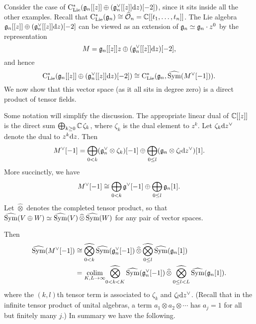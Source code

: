 Consider the case of ${\rm C}_{\rm Lie}^*(\mathfrak{g}_n[[z]] \oplus (\mathfrak{g}_n^\vee[[z]]{\rm d} z)[-2])$,
since it sits inside all the other examples.
Recall that ${\rm C}_{\rm Lie}^*(\mathfrak{g}_n) \cong \widehat{\mathcal O}_n = \mathbb C[[t_1,\ldots,t_n]]$.
The Lie algebra $\mathfrak{g}_n[[z]] \oplus (\mathfrak{g}_n^\vee[[z]]{\rm d} z)[-2]$ can be viewed 
as an extension of $\mathfrak{g}_n \simeq \mathfrak{g}_n \cdot z^0$ by the representation 
\[
M = \mathfrak{g}_n[[z]]z \oplus (\mathfrak{g}_n^\vee[[z]]{\rm d} z)[-2],
\]
and hence
\[
{\rm C}_{\rm Lie}^*(\mathfrak{g}_n[[z]] \oplus (\mathfrak{g}_n^\vee[[z]]{\rm d} z)[-2]) \cong {\rm C}_{\rm Lie}^*(\mathfrak{g}_n, \widehat{{\rm Sym}}(M^\vee[-1])).
\]
We now show that this vector space (as it all sits in degree zero) is a direct product of tensor fields.

Some notation will simplify the discussion. 
The appropriate linear dual of $\mathbb C[[z]]$ is the direct sum $\bigoplus_{k \geq 0 } \mathbb C \, \zeta_k$,
where $\zeta_k$ is the dual element to $z^k$.
Let $\zeta_k {\rm d} z^\vee$ denote the dual to $z^k{\rm d} z$.
Then
\[
M^\vee[-1] = \bigoplus_{0<k} (\mathfrak{g}_n^\vee \otimes \zeta_k)[-1] \oplus \bigoplus_{0\leq l} (\mathfrak{g}_n \otimes \zeta_l {\rm d} z^\vee)[1].
\]
More succinctly, we have
\[
M^\vee[-1] \cong \bigoplus_{0<k} \mathfrak g^\vee[-1] \oplus \bigoplus_{0\leq l} \mathfrak{g}_n[1].
\]
Let $\widehat{\otimes}$ denotes the completed tensor product, 
so that $\widehat{{\rm Sym}}(V \oplus W) \simeq \widehat{{\rm Sym}}(V)
\,\widehat{\otimes}\,\widehat{{\rm Sym}}(W)$ for any pair of vector
spaces. 


Then 
\begin{align*}
\widehat{{\rm Sym}}(M^\vee[-1]) 
& \cong \underset{{0<k}}{\widehat{\bigotimes}}\,\widehat{{\rm Sym}}(\mathfrak{g}_n^\vee[-1]) \,\widehat{\otimes}\, \underset{{0\leq l}}{\widehat{\bigotimes}}\,\widehat{{\rm Sym}}(\mathfrak{g}_n[1]) \\
&= \underset{K,L \to \infty}{\text{colim}} \underset{{0<k<K}}{\widehat{\bigotimes}}\,\widehat{{\rm Sym}}(\mathfrak{g}_n^\vee[-1]) \,\widehat{\otimes}\, \underset{{0\leq l<L}}{\widehat{\bigotimes}}\,\widehat{{\rm Sym}}(\mathfrak{g}_n[1]).
\end{align*}
where the $(k,l)$th tensor term is associated to $\zeta_k$ and $\zeta_l {\rm d} z^\vee$.
(Recall that in the infinite tensor product of unital algebras, 
a term $a_1 \otimes a_2 \otimes \cdots$ has $a_j =1$ for all but finitely many $j$.)
In summary we have the following.

